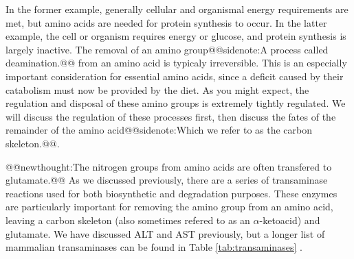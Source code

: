 \documentclass{tufte-handout}
\makeatletter
\def\newthought#1{@@newthought:#1@@}
\def\sidenote#1{@@sidenote:#1@@}
\makeatother
\begin{document}
In the former example, generally cellular and organismal energy requirements are met, but amino acids are needed for protein synthesis to occur.  In the latter example, the cell or organism requires energy or glucose, and protein synthesis is largely inactive.  The removal of an amino group\sidenote{A process called deamination.} from an amino acid is typicaly irreversible.  This is an especially important consideration for essential amino acids, since a deficit caused by their catabolism must now be provided by the diet.  As you might expect, the regulation and disposal of these amino groups is extremely tightly regulated.  We will discuss the regulation of these processes first, then discuss the fates of the remainder of the amino acid\sidenote{Which we refer to as the carbon skeleton.}.


\newthought{The nitrogen groups from amino acids are often transfered to glutamate.}  As we discussed previously, there are a series of transaminase reactions used for both biosynthetic and degradation purposes.  These enzymes are particularly important for removing the amino group from an amino acid, leaving a carbon skeleton (also sometimes refered to as an $\alpha$-ketoacid) and glutamate.  We have discussed ALT and AST previously, but a longer list of mammalian transaminases can be found in Table \ref{tab:transaminases} .
\end{document}
